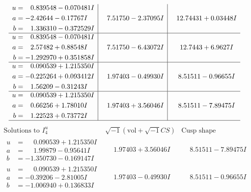 \documentclass[1p]{elsarticle_modified}
\theoremstyle{definition}
\newcommand{\I}{\sqrt{-1}}
\begin{document}
$$\begin{array}{c|c|c}
\begin{aligned}
u &= \phantom{-}0.839548 - 0.070481 I \\
a &= -2.42644 - 0.17767 I \\
b &= \phantom{-}1.336310 - 0.372529 I\end{aligned}
 & \phantom{-}7.51750 - 2.37095 I & \phantom{-}12.74431 + 0.03448 I \\ \hline\begin{aligned}
u &= \phantom{-}0.839548 - 0.070481 I \\
a &= \phantom{-}2.57482 + 0.88548 I \\
b &= -1.292970 + 0.351858 I\end{aligned}
 & \phantom{-}7.51750 - 6.43072 I & \phantom{-}12.7443 + 6.9627 I \\ \hline\begin{aligned}
u &= \phantom{-}0.090539 + 1.215350 I \\
a &= -0.225264 + 0.093412 I \\
b &= \phantom{-}1.56209 - 0.31243 I\end{aligned}
 & \phantom{-}1.97403 - 0.49930 I & \phantom{-}8.51511 - 0.96655 I \\ \hline\begin{aligned}
u &= \phantom{-}0.090539 + 1.215350 I \\
a &= \phantom{-}0.66256 + 1.78010 I \\
b &= \phantom{-}1.22523 + 0.73772 I\end{aligned}
 & \phantom{-}1.97403 + 3.56046 I & \phantom{-}8.51511 - 7.89475 I\\
 \hline 
 \end{array}$$\newpage$$\begin{array}{c|c|c}  
\text{Solutions to }I^u_{4}& \I (\text{vol} + \sqrt{-1}CS) & \text{Cusp shape}\\
 \hline 
\begin{aligned}
u &= \phantom{-}0.090539 + 1.215350 I \\
a &= \phantom{-}1.99879 - 0.95641 I \\
b &= -1.350730 - 0.169147 I\end{aligned}
 & \phantom{-}1.97403 + 3.56046 I & \phantom{-}8.51511 - 7.89475 I \\ \hline\begin{aligned}
u &= \phantom{-}0.090539 + 1.215350 I \\
a &= -0.39206 - 2.81005 I \\
b &= -1.006940 + 0.136833 I\end{aligned}
 & \phantom{-}1.97403 - 0.49930 I & \phantom{-}8.51511 - 0.96655 I \\ \hline\begin{aligned}

\end{aligned}
\end{array}$$
\end{document}
